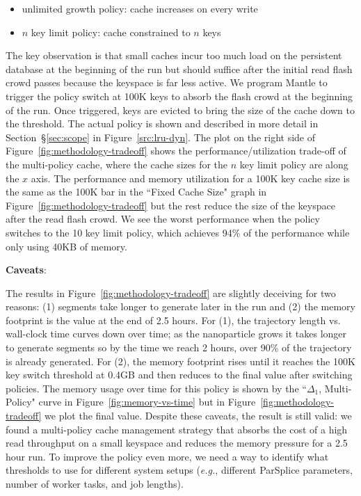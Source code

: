 \begin{itemize}
  \item unlimited growth policy: cache increases on every write
  \item \(n\) key limit policy: cache constrained to \(n\) keys
\end{itemize}

The key observation is that small caches incur too much load on the persistent
database at the beginning of the run but should suffice after the initial read
flash crowd passes because the keyspace is far less active.  We program Mantle
to trigger the policy switch at 100K keys to absorb the flash crowd at the
beginning of the run. Once triggered, keys are evicted to bring the size of the
cache down to the threshold.  The actual policy is shown and described in more
detail in Section~\S\ref{sec:scope} in Figure~\ref{src:lru-dyn}.  The plot on
the right side of Figure~\ref{fig:methodology-tradeoff} shows the
performance/utilization trade-off of the multi-policy cache, where the cache
sizes for the \(n\) key limit policy are along the \(x\) axis.  The performance
and memory utilization for a 100K key cache size is the same as the 100K bar in
the ``Fixed Cache Size" graph in Figure~\ref{fig:methodology-tradeoff} but the
rest reduce the size of the keyspace after the read flash crowd.  We see the
worst performance when the policy switches to the 10 key limit policy, which
achieves 94\% of the performance while only using 40KB of memory. 

\textbf{Caveats}: 

The results in Figure~\ref{fig:methodology-tradeoff} are slightly deceiving for
two reasons: (1) segments take longer to generate later in the run and (2) the
memory footprint is the value at the end of 2.5 hours.  For (1), the trajectory
length vs.  wall-clock time curves down over time; as the nanoparticle grows it
takes longer to generate segments so by the time we reach 2 hours, over 90\% of
the trajectory is already generated.  For (2), the memory footprint rises until
it reaches the 100K key switch threshold at 0.4GB and then reduces to the final
value after switching policies. The memory usage over time for this policy is
shown by the ``\(\Delta_1\), Multi-Policy" curve in
Figure~\ref{fig:memory-vs-time} but in Figure~\ref{fig:methodology-tradeoff} we
plot the final value.  Despite these caveats, the result is still valid: we
found a multi-policy cache management strategy that absorbs the cost of a high
read throughput on a small keyspace and reduces the memory pressure for a 2.5
hour run.  To improve the policy even more, we need a way to identify what
thresholds to use for different system setups ({\it e.g.}, different ParSplice
parameters, number of worker tasks, and job lengths).  

